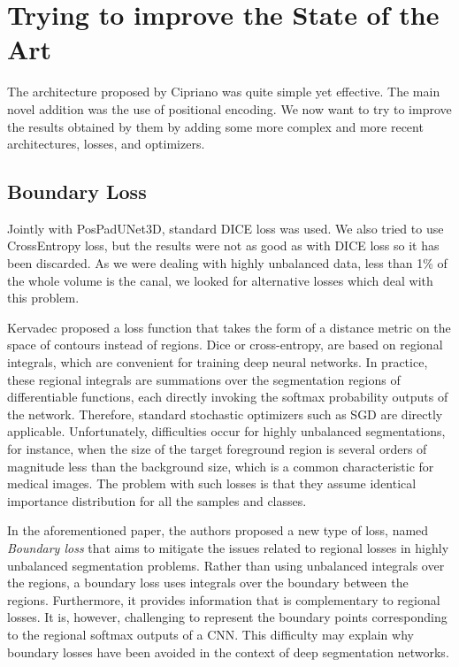 
\chapter{Trying to improve the State of the Art}

\label{chp:improve}

\def\:{\hskip0pt} %
The architecture proposed by Cipriano \etal was quite simple yet effective. The
main novel addition was the use of positional encoding. We now want to try to
improve the results obtained by them by adding some more complex
and more recent architectures, losses, and optimizers.

\section{Boundary Loss}
Jointly with PosPadUNet3D, standard DICE loss was used. We also tried to use
CrossEntropy loss, but the results were not as good as with DICE loss so it has
been discarded. As we were dealing with highly unbalanced data, less than 1\% of
the whole volume is the canal, we looked for alternative losses which deal with
this problem.

Kervadec \etal \cite{kervadec2019boundary} proposed a loss function that takes
the form of a distance metric on the space of contours instead of regions. Dice
or cross-entropy, are based on regional integrals, which are convenient for
training deep neural networks. In practice, these regional integrals are
summations over the segmentation regions of differentiable functions, each
directly invoking the softmax probability outputs of the network. Therefore,
standard stochastic optimizers such as SGD are directly applicable.
Unfortunately, difficulties occur for highly unbalanced segmentations, for
instance, when the size of the target foreground region is several orders of
magnitude less than the background size, which is a common characteristic for
medical images. The problem with such losses is that they assume identical
importance distribution for all the samples and classes.

In the aforementioned paper, the authors proposed a new type of loss, named
\emph{Boundary loss} that aims to mitigate the issues related to regional losses
in highly unbalanced segmentation problems. Rather than using unbalanced
integrals over the regions, a boundary loss uses integrals over the boundary
between the regions. Furthermore, it provides information that is complementary
to regional losses. It is, however, challenging to represent the boundary points
corresponding to the regional softmax outputs of a CNN. This difficulty may
explain why boundary losses have been avoided in the context of deep
segmentation networks.

